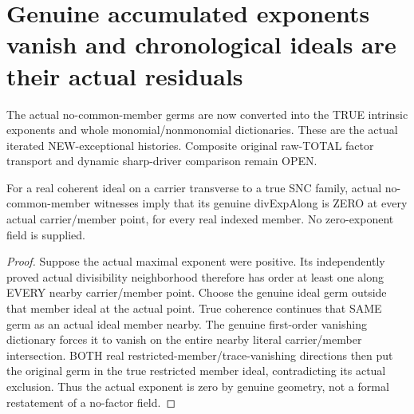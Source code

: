 \section{Genuine accumulated exponents vanish and chronological ideals are their actual residuals}

The actual no-common-member germs are now converted into the TRUE intrinsic
exponents and whole monomial/nonmonomial dictionaries. These are the actual
iterated NEW-exceptional histories. Composite original raw-TOTAL factor
transport and dynamic sharp-driver comparison remain OPEN.

\begin{lemma}
\label{hir:sharp-actual-no-member-factor-divexp-zero}
\leanok
For a real coherent ideal on a carrier transverse to a true SNC family,
actual no-common-member witnesses imply that its genuine divExpAlong is
ZERO at every actual carrier/member point, for every real indexed member.
No zero-exponent field is supplied.
\end{lemma}
\begin{proof}
Suppose the actual maximal exponent were positive. Its independently proved
actual divisibility neighborhood therefore has order at least one along
EVERY nearby carrier/member point. Choose the genuine ideal germ outside
that member ideal at the actual point. True coherence continues that SAME
germ as an actual ideal member nearby. The genuine first-order vanishing
dictionary forces it to vanish on the entire nearby literal carrier/member
intersection. BOTH real restricted-member/trace-vanishing directions then
put the original germ in the true restricted member ideal, contradicting
its actual exclusion. Thus the actual exponent is zero by genuine geometry,
not a formal restatement of a no-factor field.
\end{proof}

